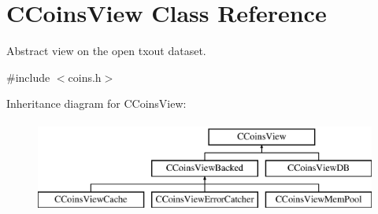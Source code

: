 \hypertarget{class_c_coins_view}{}\section{C\+Coins\+View Class Reference}
\label{class_c_coins_view}


Abstract view on the open txout dataset.  




{\ttfamily \#include $<$coins.\+h$>$}

Inheritance diagram for C\+Coins\+View\+:\begin{figure}[H]
\begin{center}
\leavevmode
\includegraphics[height=3.000000cm]{class_c_coins_view}
\end{center}
\end{figure}
